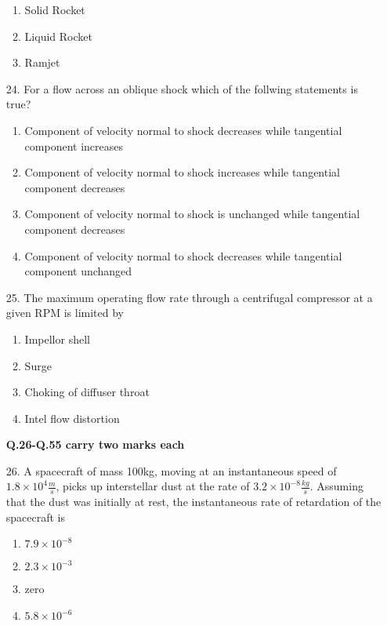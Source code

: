 \documentclass[journal]{IEEEtran}
\begin{document}
\begin{enumerate}
\begin{enumerate}[label=(\Alph*)]
    \item Solid Rocket
    \item Liquid Rocket
    \item Ramjet
 \end{enumerate}
\item[24.] For a flow across an oblique shock which of the follwing statements is true?
\begin{enumerate}[label=(\Alph*)]
    \item Component of velocity normal to shock decreases while tangential component increases
    \item Component of velocity normal to shock increases while tangential component decreases
    \item Component of velocity normal to shock is unchanged while tangential component decreases
    \item Component of velocity normal to shock decreases while tangential component unchanged
\end{enumerate}
\item[25.] The maximum operating flow rate through a centrifugal compressor at a given RPM is limited by 
\begin{enumerate}[label=(\Alph*)]
    \item Impellor shell
    \item Surge
    \item Choking of diffuser throat
    \item Intel flow distortion
\end{enumerate}
\textbf{Q.26-Q.55 carry two marks each}
\item[26.] A spacecraft of mass 100kg, moving at an instantaneous speed of $1.8\times 10^4\frac{m}{s}$, picks up interstellar dust at the rate of $3.2\times 10^{-8}\frac{kg}{s}$. Assuming that the dust was initially at rest, the instantaneous rate of retardation of the spacecraft is
\begin{enumerate}[label=(\Alph*)]
    \item $7.9\times10^{-8}$
    \item $2.3\times10^{-3}$
    \item zero
    \item $5.8\times10^{-6}$
\end{enumerate}
\end{enumerate}
\end{document}
